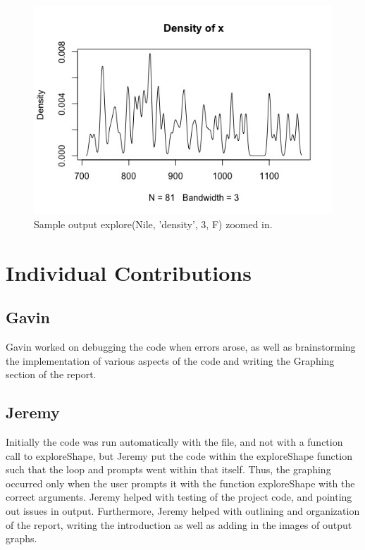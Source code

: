 \documentclass{article}
\begin{document}
\begin{figure}[H]
\centering
\includegraphics[scale=0.5]{Nile, 3 density after zoom in.jpeg}
\caption{Sample output explore(Nile, 'density', 3, F) zoomed in. }
\label{fig:Nile density graph 3, zoom in}
\end{figure}




\section{Individual Contributions}

\subsection{Gavin}
Gavin worked on debugging the code when errors arose, as well as brainstorming the implementation of various aspects of the code and writing the Graphing section of the report.

\subsection{Jeremy}
Initially the code was run automatically with the file, and not with a function call to exploreShape, but Jeremy put the code within the exploreShape function such that the loop and prompts went within that itself. Thus, the graphing occurred only when the user prompts it with the function exploreShape with the correct arguments. Jeremy helped with testing of the project code, and pointing out issues in output. Furthermore, Jeremy helped with outlining and organization of the report, writing the introduction as well as adding in the images of output graphs.
\end{document}
